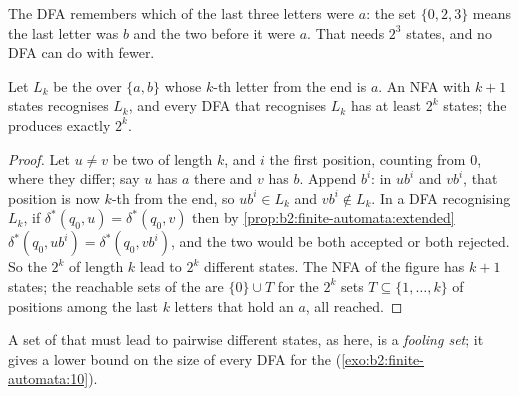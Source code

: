 \label{out:b2:finite-automata:subset}

The DFA remembers which of the last three letters were $a$: the set $\{0, 2, 3\}$ means the last letter was $b$ and
the two before it were $a$. That needs $2^3$ states, and no DFA can do with fewer.

\begin{theorem}\label{thm:b2:finite-automata:blowup}
Let $L_k$ be the  over $\{a, b\}$ whose $k$-th letter from the end is $a$. An NFA with $k + 1$ states recognises
$L_k$, and every DFA that recognises $L_k$ has at least $2^k$ states; the  produces exactly
$2^k$.
\end{theorem}

\begin{proof}
Let $u \ne v$ be two  of length $k$, and $i$ the first position, counting from 0, where they differ; say $u$ has
$a$ there and $v$ has $b$. Append $b^i$: in $ub^i$ and $vb^i$, that position is now $k$-th from the end, so $ub^i
\in L_k$ and $vb^i \notin L_k$. In a DFA recognising $L_k$, if $\delta^*(q_0, u) = \delta^*(q_0, v)$ then by
\cref{prop:b2:finite-automata:extended} $\delta^*(q_0, ub^i) = \delta^*(q_0, vb^i)$, and the two  would be both
accepted or both rejected. So the $2^k$  of length $k$ lead to $2^k$ different states. The NFA of the figure has
$k + 1$ states; the reachable sets of the  are $\{0\} \cup T$ for the $2^k$ sets $T \subseteq \{1,
\dots, k\}$ of positions among the last $k$ letters that hold an $a$, all reached.
\end{proof}

\label{out:b2:finite-automata:blowup}

A set of  that must lead to pairwise different states, as here, is a \emph{fooling set}; it gives a lower bound on
the size of every DFA for the  (\cref{exo:b2:finite-automata:10}).

